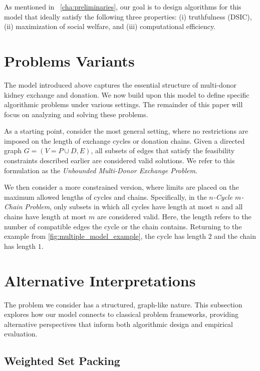 As mentioned in ~\autoref{cha:preliminaries}, our goal is to design algorithms for this model that ideally satisfy the following three properties:  
(i) truthfulness (DSIC),  
(ii) maximization of social welfare, and  
(iii) computational efficiency.

\section{Problems Variants}

The model introduced above captures the essential structure of multi-donor kidney exchange and donation. We now build upon this model to define specific algorithmic problems under various settings. The remainder of this paper will focus on analyzing and solving these problems.

As a starting point, consider the most general setting, where no restrictions are imposed on the length of exchange cycles or donation chains. Given a directed graph $G = (V = P \cup D, E)$, all subsets of edges that satisfy the feasibility constraints described earlier are considered valid solutions. We refer to this formulation as the \textit{Unbounded Multi-Donor Exchange Problem}.

We then consider a more constrained version, where limits are placed on the maximum allowed lengths of cycles and chains. Specifically, in the \textit{$n$-Cycle $m$-Chain Problem}, only subsets in which all cycles have length at most $n$ and all chains have length at most $m$ are considered valid. Here, the length refers to the number of compatible edges the cycle or the chain contains. Returning to the example from \autoref{fig:multiple_model_example}, the cycle has length $2$ and the chain has length $1$.



\section{Alternative Interpretations}

The problem we consider has a structured, graph-like nature. This subsection explores how our model connects to classical problem frameworks, providing alternative perspectives that inform both algorithmic design and empirical evaluation.

\subsection{Weighted Set Packing}

